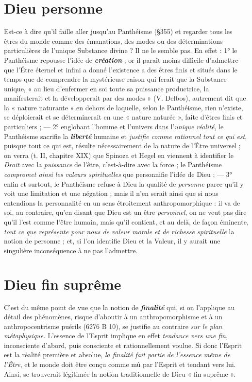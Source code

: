\section{Dieu personne}%
Est-ce à dire qu’il faille aller jusqu’au
Panthéisme (\S 355) et regarder tous les êtres du monde comme des
émanations, des modes ou des déterminations particulières de l’unique
Substance divine ? Il ne le semble pas. En effet : 1° le Panthéisme
repousse l’idée de \textbf{\textit {création}} ; or il paraît moins difficile d'admettre que
l’Étre éternel et infini a donné l’existence a des êtres finis et situés
dans le temps que de comprendre la mystérieuse raison qui ferait que
la Substance unique, « au lieu d’enfermer en soi toute sa puissance
productrice, la manifesterait et la développerait par des modes »
(V. Delbos), autrement dit que la « nature naturante » en dehors
de laquelle, selon le Panthéisme, rien n’existe, se déploierait et se
déterminerait en une « nature naturée », faite d’êtres finis et particuliers ;
— 2° englobant l’homme et l’univers dans l’{\it unique réalité},
le Panthéisme sacrifie la \textbf{\textit {liberté}} humaine et {\it justifie comme rationnel
tout ce qui est}, puisque tout ce qui est, résulte nécessairement de la
nature de l’Être universel ; on verra (t. II, chapitre XIX) que Spinoza
et Hegel en viennent à identifier le {\it Droit} avec la {\it puissance} de
l'être, c’est-à-dire avec la force ; le Panthéisme {\it compromet ainsi les
valeurs spirituelles} que personnifie l’idée de Dieu ; — 3° enfin et
surtout, le Panthéisme refuse à Dieu la qualité de {\it personne} parce qu’il
y voit une limitation et une négation ; mais il n’en serait ainsi que si
nous entendions la personnalité en un sens étroitement anthropomorphique :
il va de soi, au contraire, qu’en disant que Dieu est un
être {\it personnel}, on ne veut pas dire qu'il l’est comme l’être humain,
mais qu’il contient, et au delà, de façon éminente, {\it tout ce que représente
pour nous de valeur morale et de richesse spirituelle} la notion de
personne ; et, si l’on identifie Dieu et la Valeur, il y aurait une singulière
inconséquence à ne pas l’admettre.

\section{Dieu fin suprême}%
C’est du même point de vue que la
notion de \textbf{\textit {finalité}} qui, si on l’applique au détail des phénomènes,
risque d’aboutir à un anthropomorphisme et à un anthropocentrisme
puérils (6276 B 10), se justifie au contraire {\it sur le plan métaphysique.}
L’essence de l'Esprit implique en effet {\it tendance vers une fin}, inconsciente
d’abord, puis consciente et rationnellement voulue. Si donc
l'Esprit est la réalité première et absolue, {\it la finalité fait partie de
l'essence même de l’Être}, et le monde doit être conçu comme mû par
l'Esprit et tendant vers lui. Ainsi, se trouverait légitimée la notion
traditionnelle de Dieu « fin suprême ».

